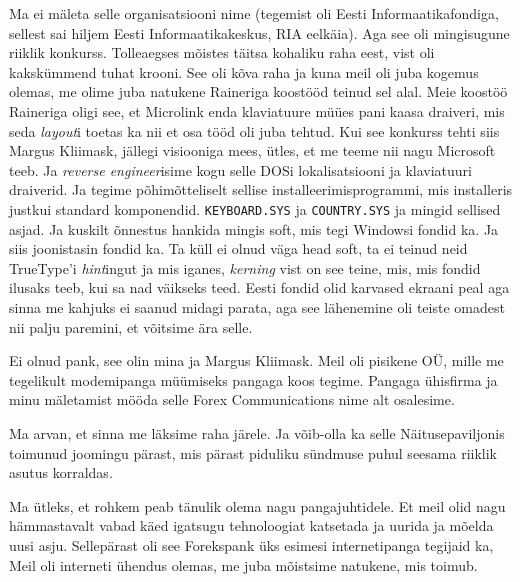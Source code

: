 Ma ei mäleta selle organisatsiooni nime (tegemist oli Eesti Informaatikafondiga, sellest
sai hiljem Eesti Informaatikakeskus, RIA eelkäia). Aga  see oli mingisugune riiklik 
konkurss. Tolleaegses mõistes täitsa kohaliku raha eest, vist oli kakskümmend 
tuhat krooni. See oli kõva raha ja kuna meil oli juba kogemus olemas, me olime 
juba natukene Raineriga koostööd teinud sel alal. Meie koostöö Raineriga oligi 
see, et Microlink enda klaviatuure müües pani kaasa draiveri, mis seda 
\emph{layout}i  toetas ka nii et osa tööd oli juba tehtud. Kui see konkurss 
tehti siis Margus Kliimask, jällegi visiooniga 
mees, ütles, et me teeme nii nagu Microsoft teeb. Ja \emph{reverse 
engineer}isime  kogu selle DOSi lokalisatsiooni ja klaviatuuri draiverid. Ja 
tegime põhimõtteliselt sellise installeerimisprogrammi, mis installeris justkui 
standard komponendid.  \verb|KEYBOARD.SYS| ja \verb|COUNTRY.SYS| ja mingid 
sellised asjad. Ja kuskilt õnnestus hankida mingis soft, mis tegi Windowsi 
fondid ka. Ja siis joonistasin fondid ka. Ta küll ei olnud väga head soft, ta 
ei teinud neid TrueType'i \emph{hint}ingut ja mis iganes, \emph{kerning} vist 
on see teine, mis, mis fondid ilusaks teeb, kui sa nad väikseks teed. Eesti 
fondid olid karvased ekraani peal aga sinna me kahjuks ei saanud midagi parata, 
aga  see lähenemine oli teiste omadest nii palju paremini, et võitsime ära 
selle.


Ei olnud pank, see olin mina ja Margus Kliimask. 
Meil oli pisikene OÜ, mille me tegelikult modemipanga müümiseks pangaga koos 
tegime. Pangaga ühisfirma ja minu mäletamist mööda selle Forex Communications 
nime alt osalesime. 


Ma arvan, et sinna me läksime raha järele. Ja võib-olla ka selle 
Näitusepaviljonis toimunud joomingu pärast, mis pärast piduliku sündmuse puhul 
seesama riiklik asutus korraldas.


Ma ütleks, et  rohkem peab tänulik olema nagu pangajuhtidele. Et meil olid nagu 
hämmastavalt vabad käed igatsugu tehnoloogiat katsetada ja uurida ja mõelda 
uusi asju. Sellepärast oli see Forekspank  üks esimesi internetipanga tegijaid 
ka, Meil oli interneti ühendus olemas, me juba mõistsime natukene, mis toimub. 

